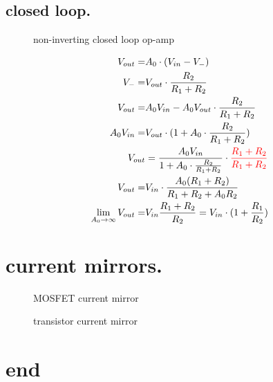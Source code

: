\documentclass[11ypt]{extarticle}
\begin{document}
\subsection{closed loop.}

\begin{figure}[H]{} 
    \centering
	
    \caption{non-inverting closed loop op-amp}
\end{figure}

\begin{equation}
\begin{aligned}
    V_{out} =& A_0 \cdot (V_{in} - V_-)
    \\
    V_- =& V_{out} \cdot \frac{R_2}{R_1 + R_2}
    \\
    V_{out} =& A_0 V_{in} - A_0 V_{out} \cdot \frac{R_2}{R_1 + R_2}
    \\
    A_0 V_{in} =& V_{out} \cdot (1 + A_0 \cdot \frac{R_2}{R_1 + R_2}) 
    \\
    V_{out} &= \frac{A_0 V_{in}} {1 + A_0 \cdot \frac{R_2}{R_1 + R_2}} \cdot \color{red}{ \frac{R_1 + R_2}{R_1 + R_2}}
    \\
    V_{out} =& V_{in} \cdot \frac{A_0 (R_1 + R_2)}{R_1 + R_2 + A_0 R_2}
    \\
    \lim_{A_0\to\infty} V_{out} =& V_{in}\frac{R_1 + R_2}{R_2} = V_{in} \cdot (1 + \frac{R_1}{R_2})
\end{aligned}
\end{equation}

\section{current mirrors.}

\begin{figure}[H]{} 
    \centering
	
    \caption{MOSFET current mirror}
\end{figure}

\begin{figure}[H]{} 
    \centering
    
    \caption{transistor current mirror}
\end{figure}

\section{end}

\end{document}
